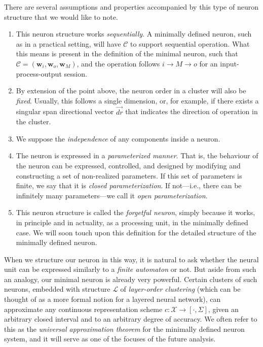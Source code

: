 There are several assumptions and properties accompanied by this type of neuron structure that we would like to note.
\begin{enumerate}
    \item This neuron structure works \textit{sequentially}. A minimally defined neuron, such as in a practical setting, will have $\mathcal{C}$ to support sequential operation. What this means is present in the definition of the minimal neuron, such that $\mathcal{C} = (\mathbf{w}_{i}, \mathbf{w}_{o}, \mathbf{w}_{M})$, and the operation follows $i \to M \to o$ for an input-process-output session.
    
    \item By extension of the point above, the neuron order in a cluster will also be \textit{fixed}. Usually, this follows a single dimension, or, for example, if there exists a singular span directional vector $\vec{dr}$ that indicates the direction of operation in the cluster.
    
    \item We suppose the \textit{independence} of any components inside a neuron.
    
    \item The neuron is expressed in a \textit{parameterized manner}. That is, the behaviour of the neuron can be expressed, controlled, and designed by modifying and constructing a set of non-realized parameters. If this set of parameters is finite, we say that it is \textit{closed parameterization}. If not—i.e., there can be infinitely many parameters—we call it \textit{open parameterization}.
    
    \item This neuron structure is called the \textit{forgetful neuron}, simply because it works, in principle and in actuality, as a processing unit, in the minimally defined case. We will soon touch upon this definition for the detailed structure of the minimally defined neuron.
\end{enumerate}

When we structure our neuron in this way, it is natural to ask whether the neural unit can be expressed similarly to a \textit{finite automaton} or not. But aside from such an analogy, our minimal neuron is already very powerful. Certain clusters of such neurons, embedded with structure $\mathcal{L}$ of \textit{layer-order clustering} (which can be thought of as a more formal notion for a layered neural network), can approximate any continuous representation scheme $c: \mathcal{X} \to [\cdot, \Sigma]$, given an arbitrary closed interval and to an arbitrary degree of accuracy. We often refer to this as the \textit{universal approximation theorem} for the minimally defined neuron system, and it will serve as one of the focuses of the future analysis.

